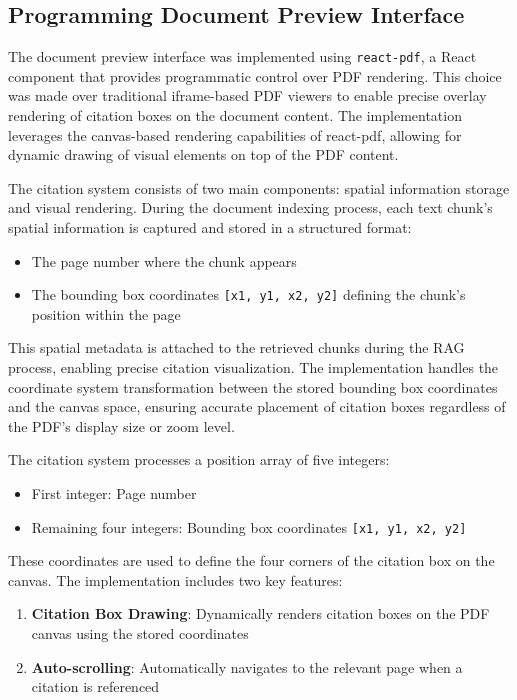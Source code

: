 \documentclass[../Main.tex]{subfiles}
\begin{document}
\subsection{Programming Document Preview Interface}
\label{section:5.3.2_programming_document_preview_interface}

The document preview interface was implemented using \texttt{react-pdf}, a React component that provides programmatic control over PDF rendering. This choice was made over traditional iframe-based PDF viewers to enable precise overlay rendering of citation boxes on the document content. The implementation leverages the canvas-based rendering capabilities of react-pdf, allowing for dynamic drawing of visual elements on top of the PDF content.

The citation system consists of two main components: spatial information storage and visual rendering. During the document indexing process, each text chunk's spatial information is captured and stored in a structured format:

\begin{itemize}
    \item The page number where the chunk appears
    \item The bounding box coordinates \texttt{[x1, y1, x2, y2]} defining the chunk's position within the page
\end{itemize}

This spatial metadata is attached to the retrieved chunks during the RAG process, enabling precise citation visualization. The implementation handles the coordinate system transformation between the stored bounding box coordinates and the canvas space, ensuring accurate placement of citation boxes regardless of the PDF's display size or zoom level.

The citation system processes a position array of five integers:
\begin{itemize}
    \item First integer: Page number
    \item Remaining four integers: Bounding box coordinates \texttt{[x1, y1, x2, y2]}
\end{itemize}

These coordinates are used to define the four corners of the citation box on the canvas. The implementation includes two key features:

\begin{enumerate}
    \item \textbf{Citation Box Drawing}: Dynamically renders citation boxes on the PDF canvas using the stored coordinates
    \item \textbf{Auto-scrolling}: Automatically navigates to the relevant page when a citation is referenced
\end{enumerate}
\end{document}
